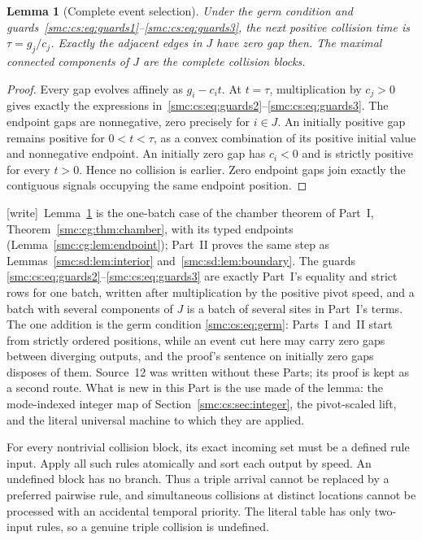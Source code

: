 \documentclass[11pt,letterpaper]{article}
\numberwithin{equation}{section}
\newtheorem{lemma}[theorem]{Lemma}
\theoremstyle{definition}
\theoremstyle{remark}
\newcommand{\wtag}{\textup{[write]}}
\begin{document}
\begin{lemma}[Complete event selection]\label{smc:cs:lem:event}
Under the germ condition and guards~\eqref{smc:cs:eq:guards1}--\eqref{smc:cs:eq:guards3}, the next positive collision time is $\tau=g_j/c_j$. Exactly the adjacent edges in $J$ have zero gap then. The maximal connected components of $J$ are the complete collision blocks.
\end{lemma}
\begin{proof}
Every gap evolves affinely as $g_i-c_it$. At $t=\tau$, multiplication by $c_j>0$ gives exactly the expressions in~\eqref{smc:cs:eq:guards2}--\eqref{smc:cs:eq:guards3}. The endpoint gaps are nonnegative, zero precisely for $i\in J$. An initially positive gap remains positive for $0<t<\tau$, as a convex combination of its positive initial value and nonnegative endpoint. An initially zero gap has $c_i<0$ and is strictly positive for every $t>0$. Hence no collision is earlier. Zero endpoint gaps join exactly the contiguous signals occupying the same endpoint position.
\end{proof}

\wtag\ Lemma~\ref{smc:cs:lem:event} is the one-batch case of the chamber theorem of Part~I, Theorem~\ref{smc:cg:thm:chamber}, with its typed endpoints (Lemma~\ref{smc:cg:lem:endpoint}); Part~II proves the same step as Lemmas~\ref{smc:sd:lem:interior} and~\ref{smc:sd:lem:boundary}. The guards \eqref{smc:cs:eq:guards2}--\eqref{smc:cs:eq:guards3} are exactly Part~I's equality and strict rows for one batch, written after multiplication by the positive pivot speed, and a batch with several components of $J$ is a batch of several sites in Part~I's terms. The one addition is the germ condition \eqref{smc:cs:eq:germ}: Parts~I and~II start from strictly ordered positions, while an event cut here may carry zero gaps between diverging outputs, and the proof's sentence on initially zero gaps disposes of them. Source~12 was written without these Parts; its proof is kept as a second route. What is new in this Part is the use made of the lemma: the mode-indexed integer map of Section~\ref{smc:cs:sec:integer}, the pivot-scaled lift, and the literal universal machine to which they are applied.

For every nontrivial collision block, its exact incoming set must be a defined rule input. Apply all such rules atomically and sort each output by speed. An undefined block has no branch. Thus a triple arrival cannot be replaced by a preferred pairwise rule, and simultaneous collisions at distinct locations cannot be processed with an accidental temporal priority. The literal table has only two-input rules, so a genuine triple collision is undefined.
\end{document}
